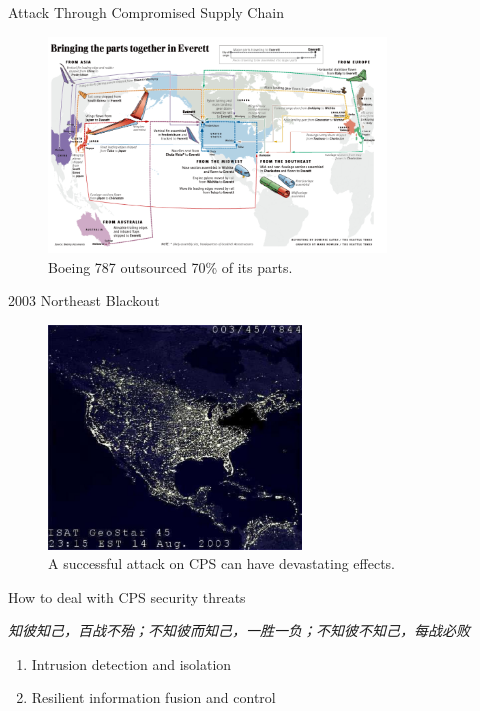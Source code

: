 \documentclass[10pt]{beamer}
\begin{document}
\begin{frame}{Attack Through Compromised Supply Chain}
  \begin{figure}[ht]
    \centering
    \includegraphics[width=0.8\textwidth]{boeing.jpg}
    \caption{Boeing 787 outsourced 70\% of its parts.}
  \end{figure}
\end{frame}

\begin{frame}{2003 Northeast Blackout}
  \begin{figure}[<+htpb+>]
    \begin{center}
      \includegraphics[width=0.60\textwidth]{blackout.jpg}
      \caption{A successful attack on CPS can have devastating effects.}
    \end{center}
  \end{figure}
\end{frame}

\begin{frame}{How to deal with CPS security threats}
  \begin{exampleblock}{}
    {\it 知彼知己，百战不殆；不知彼而知己，一胜一负；不知彼不知己，每战必败}
    \vskip5mm
    \hspace*{}
  \end{exampleblock}

  \begin{enumerate}
  \item Intrusion detection and isolation
  \item Resilient information fusion and control
  \end{enumerate}
\end{frame}
\end{document}
